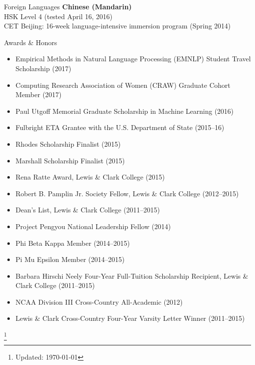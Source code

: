 \documentclass{resume} %
\newcommand\blfootnote[1]{%
  \begingroup
  \renewcommand\thefootnote{}\footnote{#1}%
  \addtocounter{footnote}{-1}%
  \endgroup
}
\begin{document}

\begin{rSection}{Foreign Languages}
\textbf{Chinese (Mandarin)} \\
HSK Level 4 (tested April 16, 2016) \\
CET Beijing: 16-week language-intensive immersion program (Spring 2014)
\end{rSection}


\begin{rSection}{Awards \& Honors}
\begin{itemize}
\item Empirical Methods in Natural Language Processing (EMNLP) Student Travel Scholarship (2017)
\item Computing Research Association of Women (CRAW) Graduate Cohort Member (2017) 
\item Paul Utgoff Memorial Graduate Scholarship in Machine Learning (2016) 
\item Fulbright ETA Grantee with the U.S. Department of State (2015--16)
\item Rhodes Scholarship Finalist (2015) 
\item Marshall Scholarship Finalist (2015) 
\item Rena Ratte Award, Lewis \& Clark College (2015) 
\item Robert B. Pamplin Jr. Society Fellow, Lewis \& Clark College (2012--2015)
\item Dean's List, Lewis \& Clark College (2011--2015)
\item Project Pengyou National Leadership Fellow (2014) 
\item Phi Beta Kappa Member (2014--2015)
\item Pi Mu Epsilon Member (2014--2015)
\item Barbara Hirschi Neely Four-Year Full-Tuition Scholarship Recipient, Lewis \& Clark College (2011--2015)
\item NCAA Division III Cross-Country All-Academic (2012) 
\item Lewis \& Clark Cross-Country Four-Year Varsity Letter Winner (2011--2015)
\end{itemize} 

\end{rSection}

\blfootnote{Updated: \today}

\bigskip
\end{document}
